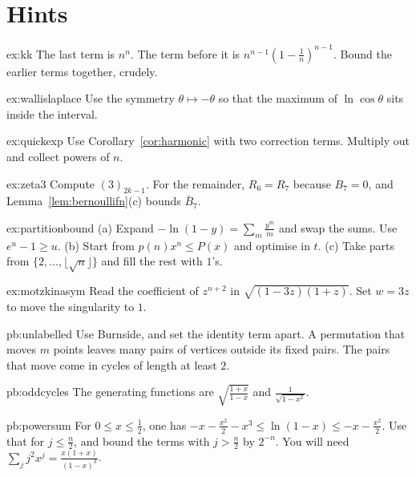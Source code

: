 \section{Hints}

\begin{hint}{ex:kk}
The last term is $n^n$. The term before it is $n^{n-1}(1-\frac1n)^{n-1}$. Bound the earlier terms together, crudely.
\end{hint}
\begin{hint}{ex:wallislaplace}
Use the symmetry $\theta\mapsto-\theta$ so that the maximum of $\ln\cos\theta$ sits inside the interval.
\end{hint}
\begin{hint}{ex:quickexp}
Use Corollary~\ref{cor:harmonic} with two correction terms. Multiply out and collect powers of $n$.
\end{hint}
\begin{hint}{ex:zeta3}
Compute $(3)_{2k-1}$. For the remainder, $R_6=R_7$ because $B_7=0$, and Lemma~\ref{lem:bernoullifn}(c) bounds $\bar B_7$.
\end{hint}
\begin{hint}{ex:partitionbound}
(a) Expand $-\ln(1-y)=\sum_m\frac{y^m}m$ and swap the sums. Use $e^u-1\ge u$. (b) Start from $p(n)x^n\le P(x)$ and optimise in $t$. (c) Take parts from $\{2,\dots,\lfloor\sqrt n\rfloor\}$ and fill the rest with $1$'s.
\end{hint}
\begin{hint}{ex:motzkinasym}
Read the coefficient of $z^{n+2}$ in $\sqrt{(1-3z)(1+z)}$. Set $w=3z$ to move the singularity to $1$.
\end{hint}

\begin{hint}{pb:unlabelled}
Use Burnside, and set the identity term apart. A permutation that moves $m$ points leaves many pairs of vertices outside its fixed pairs. The pairs that move come in cycles of length at least $2$.
\end{hint}

\begin{hint}{pb:oddcycles}
The generating functions are $\sqrt{\frac{1+x}{1-x}}$ and $\frac1{\sqrt{1-x^2}}$.
\end{hint}

\begin{hint}{pb:powersum}
For $0\le x\le\frac12$, one has $-x-\frac{x^2}2-x^3\le\ln(1-x)\le-x-\frac{x^2}2$. Use that for $j\le\frac n2$, and bound the terms with $j>\frac n2$ by $2^{-n}$. You will need $\sum_jj^2x^j=\frac{x(1+x)}{(1-x)^3}$.
\end{hint}

